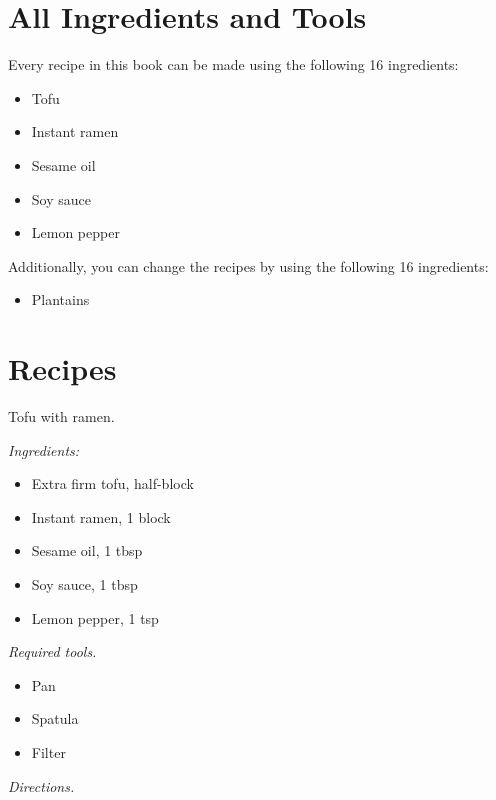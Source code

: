 \documentclass{amsbook}
\author{Abhinav Madahar}
\affil{Rutgers University}
\date{\today{}}
\begin{document}
\maketitle

\tableofcontents{}

\chapter{All Ingredients and Tools}
Every recipe in this book can be made using the following 16 ingredients:
\begin{itemize}
	\item Tofu
	\item Instant ramen
	\item Sesame oil
	\item Soy sauce
	\item Lemon pepper
\end{itemize}

Additionally, you can change the recipes by using the following 16 ingredients:
\begin{itemize}
	\item Plantains
\end{itemize}

\chapter{Recipes}
\begin{rec} Tofu with ramen. \end{rec}

\textit{Ingredients:}

\begin{itemize}
	\item Extra firm tofu, half-block
	\item Instant ramen, 1 block
	\item Sesame oil, 1 tbsp
	\item Soy sauce, 1 tbsp
	\item Lemon pepper, 1 tsp
\end{itemize}

\textit{Required tools.}
\begin{itemize}
	\item Pan
	\item Spatula
	\item Filter
\end{itemize}

\textit{Directions.}
\end{document}
